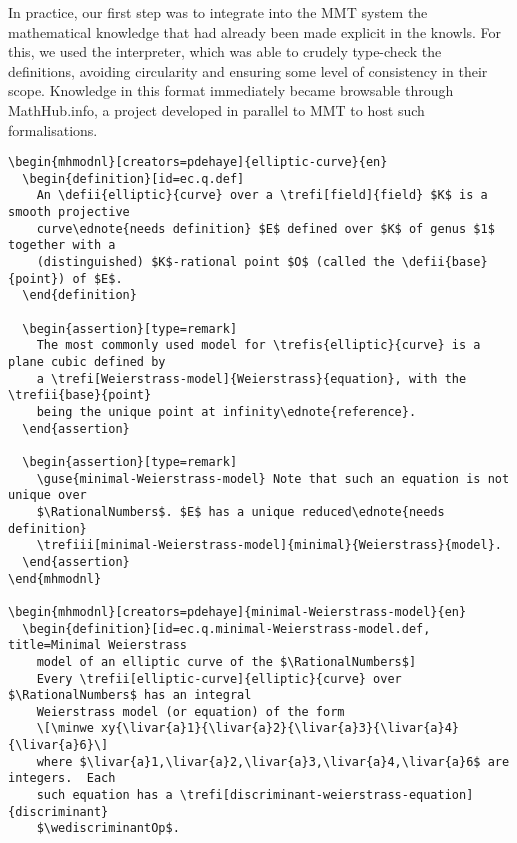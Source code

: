In practice, our first step was to integrate into the MMT system the mathematical knowledge that had already been made explicit in the knowls. For this, we used the \stex interpreter, which was able to crudely type-check the definitions, avoiding circularity and ensuring some level of consistency in their scope. Knowledge in this format immediately became browsable through \textsf{MathHub.info}, a project developed in parallel to MMT to host such formalisations. 

\begin{verbatim}
\begin{mhmodnl}[creators=pdehaye]{elliptic-curve}{en}
  \begin{definition}[id=ec.q.def]
    An \defii{elliptic}{curve} over a \trefi[field]{field} $K$ is a smooth projective
    curve\ednote{needs definition} $E$ defined over $K$ of genus $1$ together with a
    (distinguished) $K$-rational point $O$ (called the \defii{base}{point}) of $E$.
  \end{definition}
  
  \begin{assertion}[type=remark]
    The most commonly used model for \trefis{elliptic}{curve} is a plane cubic defined by
    a \trefi[Weierstrass-model]{Weierstrass}{equation}, with the \trefii{base}{point}
    being the unique point at infinity\ednote{reference}.
  \end{assertion}
  
  \begin{assertion}[type=remark]
    \guse{minimal-Weierstrass-model} Note that such an equation is not unique over
    $\RationalNumbers$. $E$ has a unique reduced\ednote{needs definition}
    \trefiii[minimal-Weierstrass-model]{minimal}{Weierstrass}{model}.
  \end{assertion}
\end{mhmodnl}

\begin{mhmodnl}[creators=pdehaye]{minimal-Weierstrass-model}{en}
  \begin{definition}[id=ec.q.minimal-Weierstrass-model.def, title=Minimal Weierstrass
    model of an elliptic curve of the $\RationalNumbers$]
    Every \trefii[elliptic-curve]{elliptic}{curve} over $\RationalNumbers$ has an integral
    Weierstrass model (or equation) of the form
    \[\minwe xy{\livar{a}1}{\livar{a}2}{\livar{a}3}{\livar{a}4}{\livar{a}6}\]
    where $\livar{a}1,\livar{a}2,\livar{a}3,\livar{a}4,\livar{a}6$ are integers.  Each
    such equation has a \trefi[discriminant-weierstrass-equation]{discriminant}
    $\wediscriminantOp$.


\end{verbatim}
